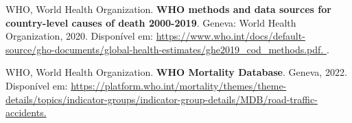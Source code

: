 \documentclass[
]{article}
\newlength{\cslhangindent}
\newenvironment{CSLReferences}[2] %
 {\begin{list}{}{%
  \setlength{\itemindent}{0pt}
  \setlength{\leftmargin}{0pt}
  \setlength{\parsep}{0pt}
  \ifodd #1
   \setlength{\leftmargin}{\cslhangindent}
   \setlength{\itemindent}{-1\cslhangindent}
  \fi
  \setlength{\itemsep}{#2\baselineskip}}}
 {\end{list}}
\begin{document}
\label{refs}
\begin{CSLReferences}{0}{1}
WHO, World Health Organization. \textbf{WHO methods and data sources for
country-level causes of death 2000-2019}. Geneva: World Health
Organization, 2020. Disponível em:
\href{https://www.who.int/docs/default-source/gho-documents/global-health-estimates/ghe2019_cod_methods.pdf}{https://www.who.int/docs/default-source/gho-documents/global-health-estimates/ghe2019\_cod\_methods.pdf.
}.

WHO, World Health Organization. \textbf{WHO Mortality Database}. Geneva,
2022. Disponível em:
\href{https://platform.who.int/mortality/themes/theme-details/topics/indicator-groups/indicator-group-details/MDB/road-traffic-accidents}{https://platform.who.int/mortality/themes/theme-details/topics/indicator-groups/indicator-group-details/MDB/road-traffic-accidents.
}

\end{CSLReferences}
\end{document}
